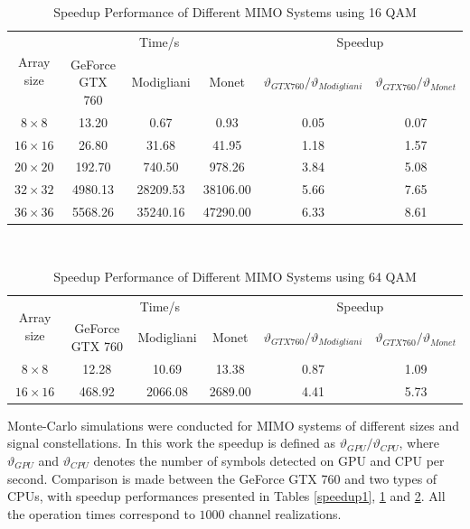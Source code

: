 \documentclass[letterpaper, 10pt, conference, twoside]{ieeeconf}
\begin{document}
\begin{table}[htb]
\centering
\caption{ Speedup Performance of Different MIMO Systems using 16 QAM}
\begin{tabular}{|c|c|c|c|c|c|}
\hline
\multirow{2}{*}{ Array size} & \multicolumn{3}{|c|}{Time/s} & \multicolumn{2}{|c|}{Speedup}\\
\cline{2-6}
&GeForce GTX 760 & Modigliani & Monet &  $\vartheta_{GTX 760}/\vartheta_{Modigliani}$  &  $\vartheta_{GTX 760}/\vartheta_{Monet}$ \\
\hline
$8\times 8$&13.20& 0.67&0.93 & 0.05&0.07\\
\hline
$16\times 16$&26.80 & 31.68&41.95& 1.18& 1.57\\
\hline
$20\times 20$&192.70 & 740.50& 978.26& 3.84& 5.08\\
\hline
$32\times 32$&4980.13& 28209.53& 38106.00& 5.66& 7.65\\
\hline
$36\times 36$& 5568.26&35240.16&47290.00&6.33& 8.61 \\
\hline
\end{tabular}
\quad\\[25pt]
\label{speedup2}
\end{table}


\begin{table}[htb]
\centering
\caption{Speedup Performance of Different MIMO Systems using 64 QAM}
\begin{tabular}{|c|c|c|c|c|c|}
\hline
\multirow{2}{*}{ Array size} & \multicolumn{3}{|c|}{Time/s} & \multicolumn{2}{|c|}{Speedup}\\
\cline{2-6}
&GeForce GTX 760 & Modigliani & Monet &  $\vartheta_{GTX 760}/\vartheta_{Modigliani}$  &  $\vartheta_{GTX 760}/\vartheta_{Monet}$ \\
\hline
$8\times 8$&12.28& 10.69&13.38 & 0.87&1.09 \\
\hline
$16\times 16$&468.92 & 2066.08&2689.00& 4.41& 5.73\\
\hline
\end{tabular}
\label{speedup3}
\end{table}
Monte-Carlo simulations were conducted for MIMO systems of different sizes and signal constellations. In this work the speedup is defined as $\vartheta_{GPU}/\vartheta_{CPU}$, where $\vartheta_{GPU}$ and $\vartheta_{CPU}$ denotes the number of symbols detected on GPU and CPU per second. Comparison is made between the GeForce GTX 760 and two types of CPUs, with speedup performances presented in Tables \ref{speedup1}, \ref{speedup2} and \ref{speedup3}. All the operation times correspond to $1000$ channel realizations.
\end{document}
